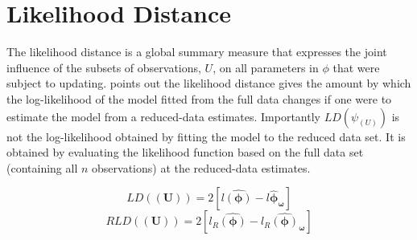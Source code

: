 \documentclass[12pt, a4paper]{article}
\begin{document}
\section{Likelihood Distance} %
The  likelihood distance is a global summary measure that expresses the joint influence of the subsets of observations, $U$, on all parameters in $\phi$ that were subject to updating. \citet{schab} points out the likelihood distance gives the amount by which the log-likelihood of the model fitted from the full data changes if one were
to estimate the model from a reduced-data estimates. Importantly $LD(\psi_{(U)})$ is not the log-likelihood obtained by fitting the model to the reduced data set. It is obtained by evaluating the likelihood function based on the full data set (containing all $n$ observations) at the reduced-data estimates.


\[  LD(\boldsymbol{(U)})= 2[l\boldsymbol{\hat{(\phi)}} - l\boldsymbol{\hat{\phi}_\omega} ] \]
\[  RLD(\boldsymbol{(U)})= 2[ l_R\boldsymbol{\hat{(\phi)}} - l_R\boldsymbol{\hat{(\phi)}_\omega} ] \]
\end{document}
